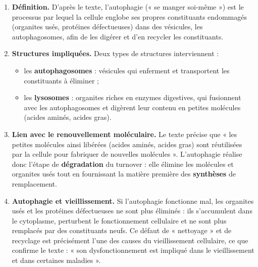 \documentclass[11pt]{article}
\begin{document}
\begin{corrige}
\begin{enumerate}
\item \textbf{Définition.} D'après le texte, l'autophagie (« se manger soi-même ») est le processus par lequel la cellule englobe ses propres constituants endommagés (organites usés, protéines défectueuses) dans des vésicules, les autophagosomes, afin de les digérer et d'en recycler les constituants.

\item \textbf{Structures impliquées.} Deux types de structures interviennent :
\begin{itemize}
\item les \textbf{autophagosomes} : vésicules qui enferment et transportent les constituants à éliminer ;
\item les \textbf{lysosomes} : organites riches en enzymes digestives, qui fusionnent avec les autophagosomes et digèrent leur contenu en petites molécules (acides aminés, acides gras).
\end{itemize}

\item \textbf{Lien avec le renouvellement moléculaire.} Le texte précise que « les petites molécules ainsi libérées (acides aminés, acides gras) sont réutilisées par la cellule pour fabriquer de nouvelles molécules ». L'autophagie réalise donc l'étape de \textbf{dégradation} du turnover : elle élimine les molécules et organites usés tout en fournissant la matière première des \textbf{synthèses} de remplacement.

\item \textbf{Autophagie et vieillissement.} Si l'autophagie fonctionne mal, les organites usés et les protéines défectueuses ne sont plus éliminés : ils s'accumulent dans le cytoplasme, perturbent le fonctionnement cellulaire et ne sont plus remplacés par des constituants neufs. Ce défaut de « nettoyage » et de recyclage est précisément l'une des causes du vieillissement cellulaire, ce que confirme le texte : « son dysfonctionnement est impliqué dans le vieillissement et dans certaines maladies ».
\end{enumerate}
\end{corrige}
\end{document}
